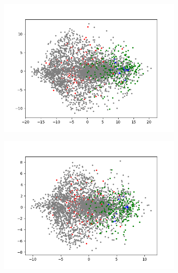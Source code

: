 \begin{figure}[H]
    \centering
    \begin{subfigure}{.25\textwidth}
        \centering
        \includegraphics[width=\textwidth]{images/figures/experiments_latent/convolutional_dim1024_PCA_classes.png}
    \end{subfigure}%
    \begin{subfigure}{.25\textwidth}
        \centering
        \includegraphics[width=\textwidth]{images/figures/experiments_latent/convolutional_dim512_PCA_classes.png}
    \end{subfigure}%
    \begin{subfigure}{.25\textwidth}
        \centering

\end{subfigure}
\end{figure}
